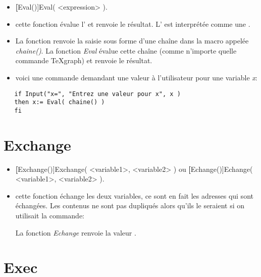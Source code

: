 \begin{itemize}
 \item \util \textbf[Eval()]{Eval( <expression> )}.
 \item \desc cette fonction évalue l' et renvoie le résultat. L' est interprétée comme une .
 \item La fonction  renvoie la saisie sous forme d'une chaîne dans la macro appelée \textit{chaine()}. La fonction \textsl{Eval} évalue cette chaîne (comme n'importe quelle commande TeXgraph) et renvoie le résultat.
 \item \exem voici une commande demandant une valeur à l'utilisateur pour une variable \textit{x}:
\end{itemize}

\begin{verbatim}
   if Input("x=", "Entrez une valeur pour x", x )
   then x:= Eval( chaine() )
   fi 
\end{verbatim}

\section{Exchange}\label{cmdEchange}

\begin{itemize}
 \item \util \textbf[Exchange()]{Exchange( <variable1>, <variable2> )} ou \textbf[Echange()]{Echange( <variable1>, <variable2> )}.
 \item \desc cette fonction échange les deux variables, ce sont en fait les adresses qui sont échangées. Les contenus ne sont pas dupliqués alors qu'ils le seraient si on utilisait la commande:

{\centering \co{[aux:=variable1, variable1:=variable2, variable2:=aux]}\par}

 La fonction \textsl{Echange} renvoie la valeur \Nil. 
\end{itemize}


\section{Exec}\label{cmdExec}

